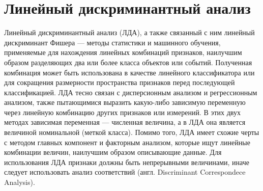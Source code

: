 \documentclass[a4paper,12pt]{article}
\theoremstyle{plain}
\begin{document}
\clearpage
	
\newpage



\section{Линейный дискриминантный анализ}
Линейный дискриминантный анализ (ЛДА), а также связанный с ним линейный дискриминант Фишера — методы статистики и машинного обучения, применяемые для нахождения линейных комбинаций признаков, наилучшим образом разделяющих два или более класса объектов или событий. Полученная комбинация может быть использована в качестве линейного классификатора или для сокращения размерности пространства признаков перед последующей классификацией.
ЛДА тесно связан с дисперсионным анализом и регрессионным анализом, также пытающимися выразить какую-либо зависимую переменную через линейную комбинацию других признаков или измерений. В этих двух методах зависимая переменная — численная величина, а в ЛДА она является величиной номинальной (меткой класса). Помимо того, ЛДА имеет схожие черты с методом главных компонент и факторным анализом, которые ищут линейные комбинации величин, наилучшим образом описывающие данные.
Для использования ЛДА признаки должны быть непрерывными величинами, иначе следует использовать анализ соответствий (англ. Discriminant Correspondece Analysis).
\end{document}
